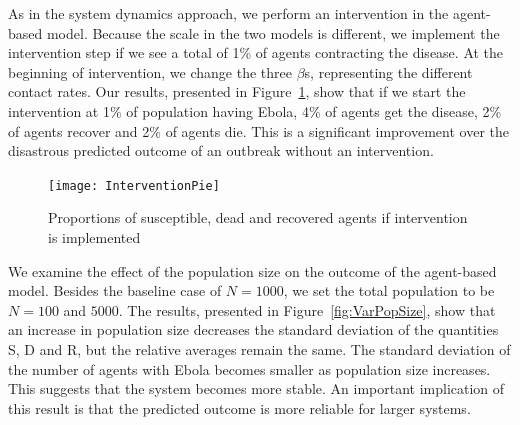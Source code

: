 
As in the system dynamics approach, we perform an intervention in the agent-based model. Because the scale in the two models is different, we implement the intervention step if we see a total of 1\% of agents contracting the disease. At the beginning of intervention, we change the three $\beta$s, representing the different contact rates. Our results, presented in Figure~\ref{fig:InterventionPie}, show that if we start the intervention at 1\% of population having Ebola, 4\% of agents get the disease, 2\% of agents recover and 2\% of agents die. This is a significant improvement over the disastrous predicted outcome of an outbreak without an intervention. 



\begin{figure}[h!]
\begin{center}
\texttt{[image: InterventionPie]}
\end{center}
\caption{Proportions of susceptible, dead and recovered agents if intervention is implemented}
\label{fig:InterventionPie}
\end{figure}

We examine the effect of the population size on the outcome of the agent-based model. Besides the baseline case of $N = 1000$, we set the total population to be $N = 100$ and $5000$. The results, presented in Figure~\ref{fig:VarPopSize}, show that an increase in population size decreases the standard deviation of the quantities S, D and R, but the relative averages remain the same. The standard deviation of the number of agents with Ebola becomes smaller as population size increases. This suggests that the system becomes more stable. An important implication of this result is that the predicted outcome is more reliable for larger systems.


